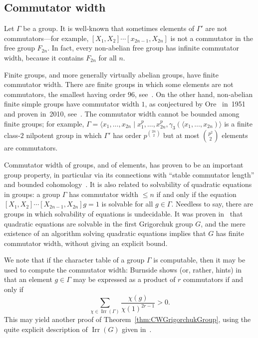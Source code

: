 \documentclass[a4paper,11pt]{amsart}
\begin{document}
\subsection{Commutator width}
Let $\Gamma$ be a group. It is well-known that sometimes elements of
$\Gamma'$ are not commutators---for example,
$[X_1,X_2]\cdots[x_{2n-1},X_{2n}]$ is not a commutator in the free
group $F_{2n}$. In fact, every non-abelian free group has infinite
commutator width, because it contains $F_{2n}$ for all $n$.

Finite groups, and more generally virtually abelian groups, have
finite commutator width.  There are finite groups in which some
elements are not commutators, the smallest having order $96$,
see~\cite{Guralnick:Group96}. On the other hand, non-abelian finite
simple groups have commutator width $1$, as conjectured by
Ore~\cite{Ore:Commutators} in~1951 and proven in~2010,
see~\cite{Liebeck:OreConjecture}. The commutator width cannot be
bounded among finite groups; for example,
$\Gamma=\langle x_1,\dots,x_{2n}\mid
x_1^p,\dots,x_{2n}^p,\gamma_3(\langle x_1,\dots,x_{2n})\rangle$ is a
finite class-$2$ nilpotent group in which $\Gamma'$ has order
$p^{\binom{2n}2}$ but at most $\binom{p^{2}}2$ elements are
commutators.

Commutator width of groups, and of elements, has proven to be an
important group property, in particular via its connections with
``stable commutator length'' and bounded
cohomology~\cite{Calegari:SCL}. It is also related to solvability of
quadratic equations in groups: a group $\Gamma$ has commutator width
$\le n$ if and only if the equation
$[X_1,X_2]\cdots[X_{2n-1},X_{2n}]g=1$ is solvable for all
$g\in\Gamma$. Needless to say, there are groups in which solvability
of equations is undecidable. It was proven
in~\cite{Lysenok:QudraticEquationsInGrig} that quadratic equations are
solvable in the first Grigorchuk group $G$, and the mere existence of
an algorithm solving quadratic equations implies that $G$ has finite
commutator width, without giving an explicit bound.

We note that if the character table of a group $\Gamma$ is computable,
then it may be used to compute the commutator width: Burnside shows
(or, rather, hints) in~\cite[\S238, Ex. 7]{Burnside:Groups} that an
element $g\in\Gamma$ may be expressed as a product of $r$ commutators
if and only if
\[\sum_{\chi\in\operatorname{Irr}(\Gamma)}\frac{\chi(g)}{\chi(1)^{2r-1}}>0.\]
This may yield another proof of Theorem~\ref{thm:CWGrigorchukGroup},
using the quite explicit description of $\operatorname{Irr}(G)$ given
in~\cite{Bartholdi:RepresentationZetaFunctions}.
\end{document}
